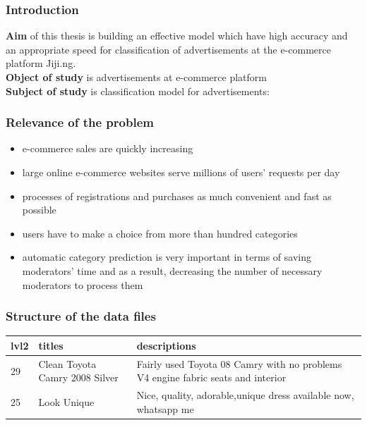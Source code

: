 \documentclass[14pt]{beamer}
\title{\small{\thesisTitle}}
\author{
		\thesisOrganizationLong\\
		\emph{Speaker:}~\thesisAuthorShort\\%
		\emph{Supervisor:}~\supervisorRegaliaShort~\supervisorFioShort\\%
	}
\date{\small{\thesisCity, \thesisYear}}
\begin{document}
		
		\maketitle

				
		\begin{frame}
			\frametitle{Introduction}
			{\textbf{Aim}} of this thesis is building an effective model which have high accuracy and an appropriate speed for classification of advertisements at the e-commerce platform Jiji.ng. \\ 
			\textbf{Object of study} is advertisements at e-commerce platform 
			\\
			\textbf{Subject of study} is classification model for advertisements: 	
		\end{frame}
		
		\begin{frame}
			\frametitle{Relevance of the problem}
				\begin{itemize}
					\item e-commerce sales are quickly increasing
					\item large online e-commerce websites serve millions of users’ requests per day
					\item processes of registrations and purchases as much convenient and fast as possible
					\item users have to make a choice from more than hundred categories
					\item  automatic category prediction is very important in terms of saving moderators' time and as a result, decreasing the number of necessary moderators to process them
				\end{itemize}	
		\end{frame}
		
		\begin{frame}
			\frametitle{Structure of the data files}
				\begin{table}[]
					\centering
					\begin{tabular}{|p{1cm} | p{3cm} | p{5cm} |}
						\hline
						\textbf{lvl2} & \textbf{titles}                  & \textbf{descriptions}                                                                   \\ \hline
					    29   & Clean Toyota Camry 2008 Silver   & Fairly used Toyota 08 Camry with no problems V4 engine fabric seats and interior            \\ \hline
						25   & Look Unique                      & Nice, quality, adorable,unique dress available now, whatsapp me                             \\ \hline
					\end{tabular}
				\end{table}
		\end{frame}
		
\end{document}
